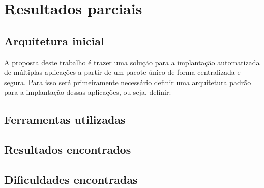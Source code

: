 \chapter{Resultados parciais}
\label{cap-resultados}

\section{Arquitetura inicial}

A proposta deste trabalho é trazer uma solução para a implantação automatizada
de múltiplas aplicações a partir de um pacote único de forma centralizada e segura.
Para isso será primeiramente necessário definir uma arquitetura padrão para a
implantação dessas aplicações, ou seja, definir:



\section{Ferramentas utilizadas}

\section{Resultados encontrados}

\section{Dificuldades encontradas}



